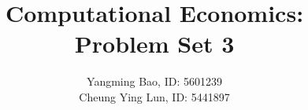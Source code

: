\documentclass[11pt]{article}
\title{Computational Economics: Problem Set 3}
\date{}
\author{Yangming Bao, ID: 5601239\\Cheung Ying Lun, ID: 5441897}
\begin{document}
\maketitle






\pagebreak
\appendix

\end{document}

